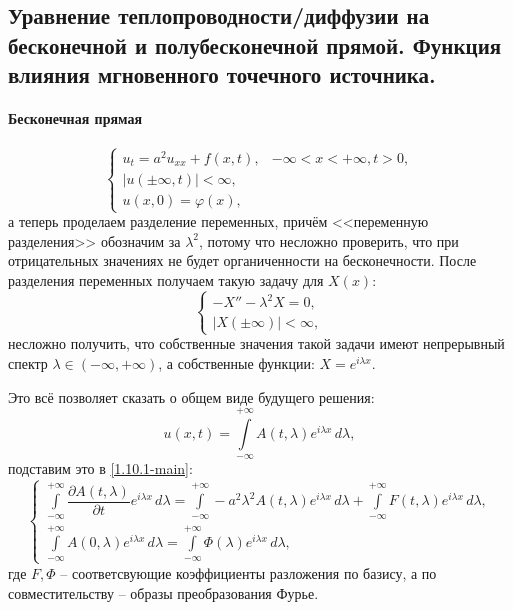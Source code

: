 \subsection{Уравнение теплопроводности/диффузии на бесконечной и полубесконечной прямой.
Функция влияния мгновенного точечного источника.}

\paragraph{Бесконечная прямая}
\begin{equation}\label{1.10.1-main}
  \begin{cases}
    u_t = a^2 u_{xx} + f(x, t), &-\infty < x < +\infty, t > 0, \\
    |u(\pm \infty, t)| < \infty, \\
    u(x, 0) = \varphi(x),
  \end{cases}
\end{equation}
а теперь проделаем разделение переменных, причём <<переменную разделения>> обозначим за $\lambda^2$,
потому что несложно проверить, что при отрицательных значениях не будет органиченности на
бесконечности. После разделения переменных получаем такую задачу для $X(x)$:
\[
  \begin{cases}
    -X'' - \lambda^2 X = 0, \\
    |X(\pm \infty)| < \infty,
  \end{cases}
\]
несложно получить, что собственные значения такой задачи имеют непрерывный спектр
$\lambda \in (-\infty, +\infty)$, а собственные функции: $X = e^{i\lambda x}$.

Это всё позволяет сказать о общем виде будущего решения:
\[
  u(x, t) = \int\limits_{-\infty}^{+\infty} A(t, \lambda) e^{i \lambda x} \, d\lambda,
\]
подставим это в \eqref{1.10.1-main}:
\[
  \begin{cases}
    \int\limits_{-\infty}^{+\infty} \dfrac{\partial A(t, \lambda)}{\partial t} e^{i \lambda x} \, d\lambda
      = \int\limits_{-\infty}^{+\infty} - a^2 \lambda^2 A(t, \lambda) e^{i \lambda x} \, d\lambda
      + \int\limits_{-\infty}^{+\infty} F(t, \lambda) e^{i \lambda x} \, d\lambda, \\
    
    \int\limits_{-\infty}^{+\infty} A(0, \lambda) e^{i \lambda x} \, d\lambda 
      = \int\limits_{-\infty}^{+\infty} \Phi(\lambda) e^{i \lambda x} \, d\lambda,
  \end{cases}
\]
где $F, \Phi$ -- соответсвующие коэффициенты разложения по базису, а по совместительству -- образы 
преобразования Фурье.

